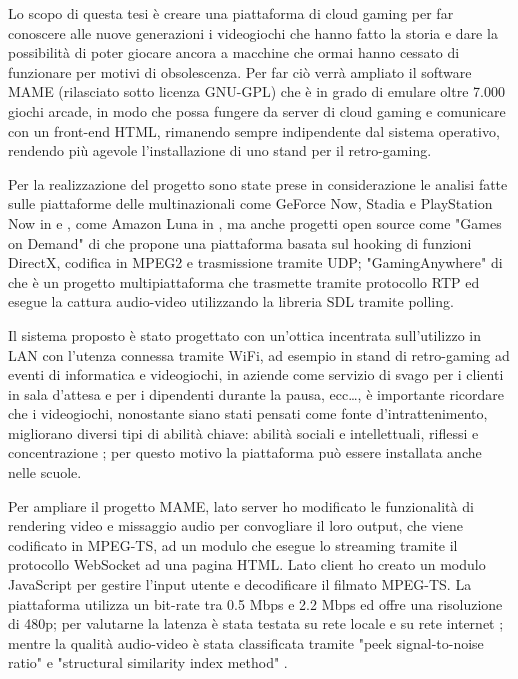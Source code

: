 Lo scopo di questa tesi è creare una piattaforma di cloud gaming per far conoscere alle nuove generazioni i videogiochi che hanno fatto la storia e dare la possibilità di poter giocare ancora a macchine che ormai hanno cessato di funzionare per motivi di obsolescenza. Per far ciò verrà ampliato il software MAME (rilasciato sotto licenza GNU-GPL) che è in grado di emulare oltre 7.000 giochi arcade, in modo che possa fungere da server di cloud gaming e comunicare con un front-end HTML, rimanendo sempre indipendente dal sistema operativo, rendendo più agevole l’installazione di uno stand per il retro-gaming. 

Per la realizzazione del progetto sono state prese in considerazione le analisi fatte sulle piattaforme delle multinazionali come GeForce Now, Stadia e PlayStation Now in \parencite{A_Network_Analysis_on_Cloud_Gaming_Stadia_GeForce_Now_and_PSNow} e \parencite{Network_Analysis_of_the_Sony_Remote_Play_System}, come Amazon Luna in \parencite{Amazon_Luna_WebRTC}, ma anche progetti open source come "Games on Demand" di \parencite{ARealTimeStreamingGamesonDemandSystem} che propone una piattaforma basata sul hooking di funzioni DirectX, codifica in MPEG2 e trasmissione tramite UDP; "GamingAnywhere" di \parencite{GamingAnywhere} che è un progetto multipiattaforma che trasmette tramite protocollo RTP ed esegue la cattura audio-video utilizzando la libreria SDL tramite polling.

Il sistema proposto è stato progettato con un'ottica incentrata sull'utilizzo in LAN con l'utenza connessa tramite WiFi, ad esempio in stand di retro-gaming ad eventi di informatica e videogiochi, in aziende come servizio di svago per i clienti in sala d'attesa e per i dipendenti durante la pausa, ecc\dots, è importante ricordare che i videogiochi, nonostante siano stati pensati come fonte d'intrattenimento, migliorano diversi tipi di abilità chiave: abilità sociali e intellettuali, riflessi e concentrazione \parencite{Use_of_Cloud_Gaming_in_Education}; per questo motivo la piattaforma può essere installata anche nelle scuole.

Per ampliare il progetto MAME, lato server ho modificato le funzionalità di rendering video e missaggio audio per convogliare il loro output, che viene codificato in MPEG-TS, ad un modulo che esegue lo streaming tramite il protocollo WebSocket ad una pagina HTML. Lato client ho creato un modulo JavaScript per gestire l'input utente e decodificare il filmato MPEG-TS. La piattaforma utilizza un bit-rate tra 0.5 Mbps e 2.2 Mbps ed offre una risoluzione di 480p; per valutarne la latenza è stata testata su rete locale e su rete internet \parencite{Latency_analysis_for_M2M}; mentre la qualità audio-video è stata classificata tramite "peek signal-to-noise ratio" e "structural similarity index method" \parencite{Cloud_Gaming_Architecture_and_Performance}.



